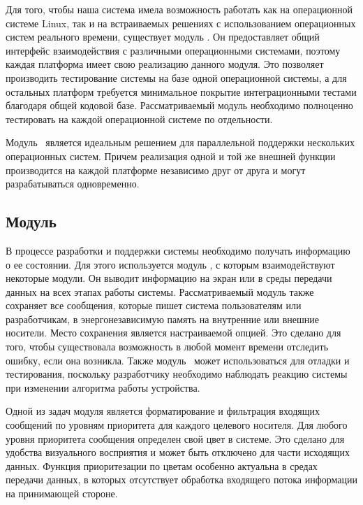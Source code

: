 Для того, чтобы наша система имела возможность работать как на операционной системе Linux, так и на встраиваемых решениях с использованием операционных систем реального времени, существует модуль \moduleOsal. Он предоставляет общий интерфейс взаимодействия с различными операционными системами, поэтому каждая платформа имеет свою реализацию данного модуля. Это позволяет производить тестирование системы на базе одной операционной системы, а для остальных платформ требуется минимальное покрытие интеграционными тестами благодаря общей кодовой базе. Рассматриваемый модуль необходимо полноценно тестировать на каждой операционной системе по отдельности.

Модуль \moduleOsal\ является идеальным решением для параллельной поддержки нескольких операционных систем. Причем реализация одной и той же внешней функции производится на каждой платформе независимо друг от друга и могут разрабатываться одновременно.

\subsection{Модуль \moduleLog}

В процессе разработки и поддержки системы необходимо получать информацию о ее состоянии. Для этого используется модуль \moduleLog, с которым взаимодействуют некоторые модули. Он выводит информацию на экран или в среды передачи данных на всех этапах работы системы. Рассматриваемый модуль также сохраняет все сообщения, которые пишет система пользователям или разработчикам, в энергонезависимую память на внутренние или внешние носители. Место сохранения является настраиваемой опцией. Это сделано для того, чтобы существовала возможность в любой момент времени отследить ошибку, если она возникла. Также модуль \moduleLog\ может использоваться для отладки и тестирования, поскольку разработчику необходимо наблюдать реакцию системы при изменении алгоритма работы устройства.

Одной из задач модуля является форматирование и фильтрация входящих сообщений по уровням приоритета для каждого целевого носителя. Для любого уровня приоритета сообщения определен свой цвет в системе. Это сделано для удобства визуального восприятия и может быть отключено для части исходящих данных. Функция приоритезации по цветам особенно актуальна в средах передачи данных, в которых отсутствует обработка входящего потока информации на принимающей стороне.
